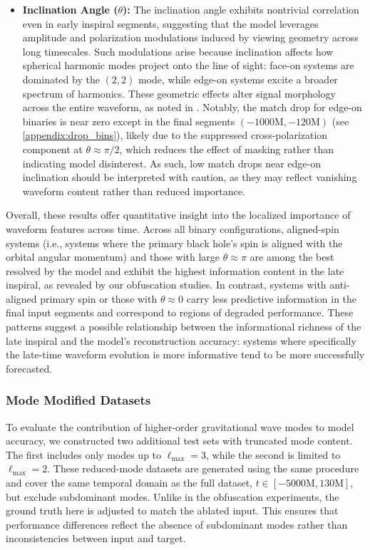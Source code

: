 \documentclass[12pt]{iopart}
\begin{document}
\begin{itemize}
    \item \textbf{Inclination Angle ($\theta$):} The inclination angle exhibits nontrivial correlation even in early inspiral segments, suggesting that the model leverages amplitude and polarization modulations induced by viewing geometry across long timescales. Such modulations arise because inclination affects how spherical harmonic modes project onto the line of sight: face-on systems are dominated by the $(2,2)$ mode, while edge-on systems excite a broader spectrum of harmonics. These geometric effects alter signal morphology across the entire waveform, as noted in \cite{PhysRevD.87.084008}. Notably, the match drop for edge-on binaries is near zero except in the final segments $(-1000\mathrm{M}, -120\mathrm{M})$ (see \ref{appendix:drop_bins}), likely due to the suppressed cross-polarization component at $\theta \approx \pi/2$, which reduces the effect of masking rather than indicating model disinterest. As such, low match drops near edge-on inclination should be interpreted with caution, as they may reflect vanishing waveform content rather than reduced importance.
\end{itemize}


Overall, these results offer quantitative insight into the localized importance of waveform features across time. Across all binary configurations, aligned-spin systems (i.e., systems where the primary black hole’s spin is aligned with the orbital angular momentum) and those with large $\theta \approx \pi$ are among the best resolved by the model and exhibit the highest information content in the late inspiral, as revealed by our obfuscation studies. In contrast, systems with anti-aligned primary spin or those with $\theta \approx 0$ carry less predictive information in the final input segments and correspond to regions of degraded performance. These patterns suggest a possible relationship between the informational richness of the late inspiral and the model's reconstruction accuracy: systems where specifically the late-time waveform evolution is more informative tend to be more successfully forecasted.

\subsubsection{Mode Modified Datasets}


To evaluate the contribution of higher-order gravitational wave modes to model accuracy, we constructed two additional test sets with truncated mode content. The first includes only modes up to $\ell_{\max}=3$, while the second is limited to $\ell_{\max}=2$. These reduced-mode datasets are generated using the same procedure and cover the same temporal domain as the full 
dataset, $t \in [-5000\textrm{M}, 130\textrm{M}]$, but exclude subdominant modes. Unlike in the obfuscation experiments, the ground truth here is adjusted to match the ablated input. This ensures that performance differences reflect the absence of subdominant modes rather than inconsistencies between input and target.
\end{document}
